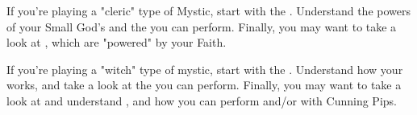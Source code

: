 \begin{multicols*}{2}

If you're playing a "cleric" type of Mystic, start with the . Understand the powers of your Small God's  and the  you can perform. Finally, you may want to take a look at , which are "powered" by your Faith.

\cbreak


If you're playing a "witch" type of mystic, start with the . Understand how your  works, and take a look at the  you can perform. Finally, you may want to take a look at and understand , and how you can perform  and/or  with Cunning Pips.

\end{multicols*}
